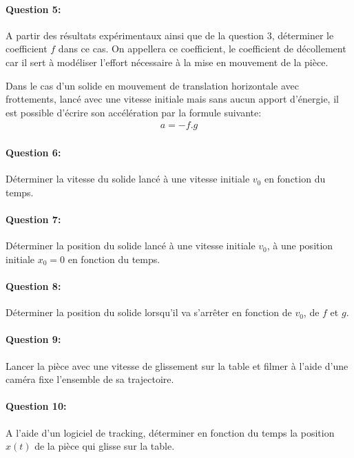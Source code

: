 
\paragraph{Question 5:} A partir des résultats expérimentaux ainsi que de la question 3, déterminer le coefficient $f$ dans ce cas. On appellera ce coefficient, le coefficient de décollement car il sert à modéliser l'effort nécessaire à la mise en mouvement de la pièce.


Dans le cas d'un solide en mouvement de translation horizontale avec frottements, lancé avec une vitesse initiale mais sans aucun apport d'énergie, il est possible d'écrire son accélération par la formule suivante:
\begin{eqnarray}
 a=-f.g
\end{eqnarray}

\paragraph{Question 6:} Déterminer la vitesse du solide lancé à une vitesse initiale $v_0$ en fonction du temps.

\paragraph{Question 7:} Déterminer la position du solide lancé à une vitesse initiale $v_0$, à une position initiale $x_0=0$ en fonction du temps.

\paragraph{Question 8:} Déterminer la position du solide lorsqu'il va s'arrêter en fonction de $v_0$, de $f$ et $g$.


\paragraph{Question 9:} Lancer la pièce avec une vitesse de glissement sur la table et filmer à l'aide d'une caméra fixe l'ensemble de sa trajectoire.

\paragraph{Question 10:} A l'aide d'un logiciel de tracking, déterminer en fonction du temps la position $x(t)$ de la pièce qui glisse sur la table.

